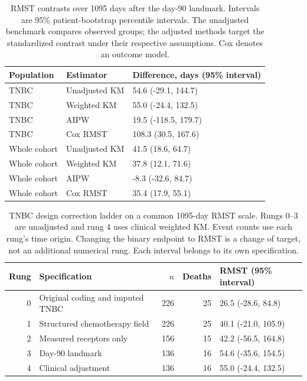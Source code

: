 \documentclass[12pt,letterpaper]{article}
\begin{document}
\clearpage
\begin{table}[p]
\centering
\caption{RMST contrasts over 1095 days after the day-90 landmark. Intervals are 95\% patient-bootstrap
percentile intervals. The unadjusted benchmark compares observed groups; the adjusted methods target
the standardized contrast under their respective assumptions. Cox denotes an outcome model.}
\label{tab:comparison}
\setlength{\tabcolsep}{3pt}
\begin{tabular}{p{1.05in}p{1.45in}p{3.0in}}
\toprule Population & Estimator & Difference, days (95\% interval)\\\midrule
TNBC & Unadjusted KM & 54.6 (-29.1, 144.7) \\
TNBC & Weighted KM & 55.0 (-24.4, 132.5) \\
TNBC & AIPW & 19.5 (-118.5, 179.7) \\
TNBC & Cox RMST & 108.3 (30.5, 167.6) \\
Whole cohort & Unadjusted KM & 41.5 (18.6, 64.7) \\
Whole cohort & Weighted KM & 37.8 (12.1, 71.6) \\
Whole cohort & AIPW & -8.3 (-32.6, 84.7) \\
Whole cohort & Cox RMST & 35.4 (17.9, 55.1) \\
\bottomrule
\end{tabular}
\end{table}
\clearpage
\begin{table}[p]
\centering
\caption{TNBC design correction ladder on a common 1095-day RMST scale.
Rungs 0--3 are unadjusted and rung 4 uses clinical weighted KM.
Event counts use each rung's time origin. Changing the binary endpoint to RMST is a change of target,
not an additional numerical rung. Each interval belongs to its own specification.}
\label{tab:ladder}
\setlength{\tabcolsep}{3pt}
\begin{tabular}{rp{2.1in}rrp{1.7in}}
\toprule Rung & Specification & $n$ & Deaths & RMST (95\% interval)\\\midrule
0 & Original coding and imputed TNBC & 226 & 25 & 26.5 (-28.6, 84.8) \\
1 & Structured chemotherapy field & 226 & 25 & 40.1 (-21.0, 105.9) \\
2 & Measured receptors only & 156 & 15 & 42.2 (-56.5, 164.8) \\
3 & Day-90 landmark & 136 & 16 & 54.6 (-35.6, 154.5) \\
4 & Clinical adjustment & 136 & 16 & 55.0 (-24.4, 132.5) \\
\bottomrule
\end{tabular}
\end{table}
\end{document}
